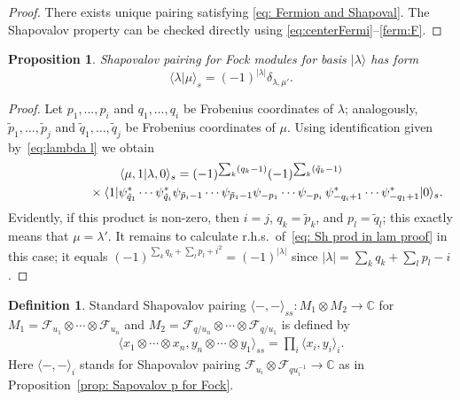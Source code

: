 \documentclass[pdftex]{sigma}
\numberwithin{equation}{section}
\newtheorem{Proposition}[Theorem]{Proposition}
\theoremstyle{definition}
\newtheorem{Definition}[Theorem]{Definition}
\newcommand{\vac}{|0 \rangle}
\begin{document}
\begin{proof}
There exists unique pairing satisfying \eqref{eq: Fermion and Shapoval}. The Shapovalov property can be checked directly using \eqref{eq:centerFermi}--\eqref{ferm:F}.
\end{proof}

\begin{Proposition} \label{prop: sign l}Shapovalov pairing for Fock modules for basis $| \lambda \rangle$ has form
\[ \langle \lambda | \mu \rangle_s = (-1)^{|\lambda|} \delta_{\lambda, \mu'}.\]
\end{Proposition}

\begin{proof}Let $p_1, \dots, p_i$ and $q_1, \dots, q_i$ be Frobenius coordinates of $\lambda$; analogously, $\tilde{p}_1, \dots, \tilde{p}_j$ and $\tilde{q}_1, \dots, \tilde{q}_j$ be Frobenius coordinates of $\mu$. Using identification given by~\eqref{eq:lambda l} we obtain
\begin{gather}
\langle \mu, 1 | \lambda,0 \rangle_s = (-1)^{\sum_k (q_k-1)} (-1)^{\sum_k (\tilde{q}_k-1)} \nonumber\\
\hphantom{\langle \mu, 1 | \lambda,0 \rangle_s =}{}\times \langle 1 | \psi_{\tilde{q}_1}^* \cdots \psi_{\tilde{q}_i}^* \psi_{\tilde{p}_i-1} \cdots \psi_{\tilde{p}_1-1} \psi_{-p_1} \cdots \psi_{-p_i} \, \psi_{-q_i+1}^* \cdots \psi_{-q_1+1}^* \vac_s.\label{eq: Sh prod in lam proof}
\end{gather}
Evidently, if this product is non-zero, then $i=j$, $q_k=\tilde{p}_k$, and $p_l = \tilde{q}_l$; this exactly means that $\mu = \lambda'$. It remains to calculate r.h.s.\ of~\eqref{eq: Sh prod in lam proof} in this case; it equals $(-1)^{\sum_k q_k+\sum_l p_l+i^2} = (-1)^{|\lambda|}$ since $|\lambda| = \sum_k q_k+\sum_l p_l-i $.
\end{proof}

\begin{Definition}
Standard Shapovalov pairing $\langle -, - \rangle_{ss} \colon M_1 \otimes M_2 \rightarrow \mathbb{C}$ for $M_1 = \mathcal{F}_{u_1} \otimes \cdots \otimes \mathcal{F}_{u_n} $ and $M_2 = \mathcal{F}_{q/u_n} \otimes \cdots \otimes \mathcal{F}_{q/u_1}$ is defined by
\begin{gather*}
\langle x_1 \otimes \cdots \otimes x_n, y_n \otimes \cdots \otimes y_1 \rangle_{ss} = \prod_i \langle x_i , y_i \rangle_i.
\end{gather*}
Here $\langle -,-\rangle_i$ stands for Shapovalov pairing $\mathcal{F}_{u_i} \otimes \mathcal{F}_{q u_i^{-1}} \rightarrow \mathbb{C}$ as in Proposition~\ref{prop: Sapovalov p for Fock}.
\end{Definition}
\end{document}
